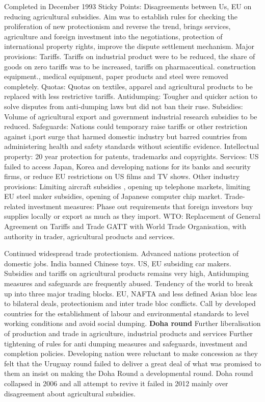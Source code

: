 \documentclass[12pt]{examnotes}
\begin{document}
\ra Completed in December 1993
\ra Sticky Points:
 Disagreements between Us, EU on reducing agricultural subsidies.
\ra Aim was to establish rules for checking the proliferation of new protectionism and reverse the trend, brings services, agriculture and foreign investment into the negotiations, protection of international property rights, improve the dispute settlement mechanism. 
\ra Major provisions:
 Tariffs. Tariffs on industrial product were to be reduced, the share of goods on zero tariffs was to be increased, tariffs on pharmaceutical. construction equipment., medical equipment, paper products and steel were removed completely.
 Quotas: Quotas on textiles, apparel and agricultural products to be replaced with less restrictive tariffs.
 Antidumping: Tougher and quicker action to solve disputes from anti-dumping laws but did not ban their ruse.
 Subsidies: Volume of agricultural export  and government industrial research subsidies to be reduced.
 Safeguards: Nations could temporary  raise tariffs or other restriction against i,port surge that harmed domestic industry but barred countries from administering health and safety standards without scientific evidence.
 Intellectual property: 20 year protection for patents, trademarks and copyrights.
 Services: US failed to access Japan, Korea and developing nations for its banks and security firms, or reduce EU restrictions on US films and TV shows.
 Other industry provisions: Limiting aircraft subsidies , opening up telephone markets, limiting EU steel maker subsidies, opening of Japanese computer chip market.
 Trade-related investment measures: Phase out requirements that foreign investors buy supplies locally or export as much as they import.
 WTO: Replacement of General Agreement on Tariffs and Trade GATT with World Trade Organisation, with authority in trader, agricultural products and services.

\ra Continued widespread trade protectionism. Advanced nations protection of domestic jobs. India banned Chinese toys. US, EU subsiding car makers.
\ra Subsidies and tariffs on agricultural products remains very high, Antidumping measures and safeguards are frequently abused.
\ra Tendency of the world to break up into three major trading blocks. EU, NAFTA and less defined Asian bloc leas to bilateral deals, protectionism and inter trade bloc conflicts.
\ra Call by developed countries for the establishment of labour and environmental standards to level working conditions and avoid social dumping. 
{\bf Doha round}
\ra Further liberalisation of production and trade in agriculture, industrial products and services
\ra Further tightening of rules for anti dumping measures and safeguards, investment and completion policies.
\ra Developing nation were reluctant to make concession as they felt that the Uruguay round failed to deliver a great deal of what was promised to them an insist on making the Doha Round a developmental round. 
\ra Doha round collapsed in 2006 and all attempt to revive it failed in 2012 mainly over disagreement about agricultural subsidies.
\end{document}
